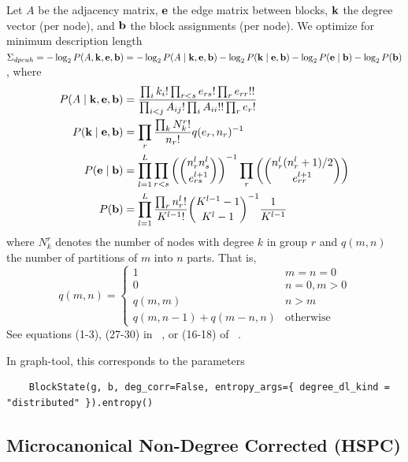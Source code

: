 \documentclass[aps,pre,superscriptaddress]{revtex4}
\begin{document}
Let $A$ be the adjacency matrix, $\vb{e}$ the edge matrix between blocks, $\vb{k}$ the degree vector (per node), and $\vb{b}$ the block assignments (per node).
We optimize for minimum description length $\Sigma_{dpcuh} = -\log_2P(A, \vb{k}, \vb{e}, \vb{b}) = -\log_2P(A \mid \vb{k}, \vb{e}, \vb{b}) - \log_2 P(\vb{k} \mid \vb{e}, \vb{b}) - \log_2 P(\vb{e} \mid \vb{b}) - \log_2 P(\vb{b}) $, where
\begin{align}
	P(A \mid \vb{k}, \vb{e}, \vb{b}) & = \frac{ \prod_i k_i! \prod_{r < s} e_{rs}! \prod_{r} e_{rr}!!} {\prod_{i < j} A_{ij}! \prod_i A_{ii}!! \prod_r e_r!}                                      \\
	P(\vb{k} \mid \vb{e}, \vb{b})    & = \prod_r \frac{\prod_k N_k^r!}{n_r!} q(e_r, n_r)^{-1}                                                                                                     \\
	P(\vb{e} \mid \vb{b})            & = \prod_{l=1}^{L} \prod_{r < s} \left( \binom{n_r^l n_s^l}{e_{rs}^{l+1}} \right)^{-1} \prod_r \left( \binom{ n_r^l (n_r^l + 1) / 2 }{e_{rr}^{l+1} }\right) \\
	P(\vb{b})                        & = \prod_{l=1}^L \frac{\prod_r n_r^l!}{K^{l-1}!} \binom{ K^{l-1} - 1}{K^l - 1}^{-1} \frac{1}{K^{l-1}}
\end{align}
where $N_k^r$ denotes the number of nodes with degree $k$ in group $r$ and $q(m, n)$ the number of partitions of $m$ into $n$ parts.
That is,
\begin{equation}
	q(m, n) =
	\begin{cases}
		1                         & m = n = 0        \\
		0                         & n = 0, m > 0     \\
		q(m, m)                   & n > m            \\
		q(m, n - 1) + q(m - n, n) & \text{otherwise}
	\end{cases}
\end{equation}
See equations (1-3), (27-30) in ~\cite{peixoto17-01}, or (16-18) of ~\cite{funke19-04}.

In graph-tool, this corresponds to the parameters
\begin{verbatim}
    BlockState(g, b, deg_corr=False, entropy_args={ degree_dl_kind = "distributed" }).entropy()
\end{verbatim}

\subsection*{Microcanonical Non-Degree Corrected (HSPC)}
\end{document}
